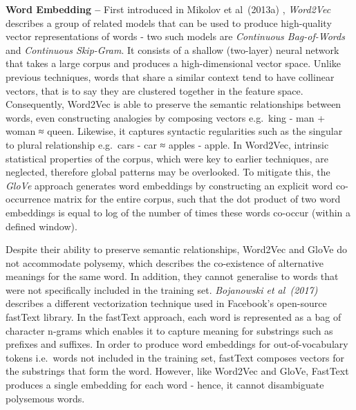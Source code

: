 \documentclass[12pt,a4paper]{article}
\begin{document}
\noindent \textbf{Word Embedding --} First introduced in Mikolov et al\ (2013a) \cite{mikolov2013efficient}, \textit{Word2Vec} describes a group of related models that can be used to produce high-quality vector representations of words - two such models are \textit{Continuous Bag-of-Words} and \textit{Continuous Skip-Gram}. It consists of a shallow (two-layer) neural network that takes a large corpus and produces a high-dimensional vector space. Unlike previous techniques, words that share a similar context tend to have collinear vectors, that is to say they are clustered together in the feature space. Consequently, Word2Vec is able to preserve the semantic relationships between words, even constructing analogies by composing vectors e.g.\ king - man + woman ≈ queen. Likewise, it captures syntactic regularities such as the singular to plural relationship e.g.\ cars - car ≈ apples - apple. In Word2Vec, intrinsic statistical properties of the corpus, which were key to earlier techniques, are neglected, therefore global patterns may be overlooked. To mitigate this, the \textit{GloVe} \cite{pennington2014glove} approach generates word embeddings by constructing an explicit word co-occurrence matrix for the entire corpus, such that the dot product of two word embeddings is equal to log of the number of times these words co-occur (within a defined window).

Despite their ability to preserve semantic relationships, Word2Vec and GloVe do not accommodate polysemy, which describes the co-existence of alternative meanings for the same word. In addition, they cannot generalise to words that were not specifically included in the training set. \textit{Bojanowski et al\ (2017)} \cite{bojanowski2016enriching} describes a different vectorization technique used in Facebook's open-source fastText library. In the fastText approach, each word is represented as a bag of character n-grams which enables it to capture meaning for substrings such as prefixes and suffixes. In order to produce word embeddings for out-of-vocabulary tokens i.e.\ words not included in the training set, fastText composes vectors for the substrings that form the word. However, like Word2Vec and GloVe, FastText produces a single embedding for each word - hence, it cannot disambiguate polysemous words.\\
\end{document}
